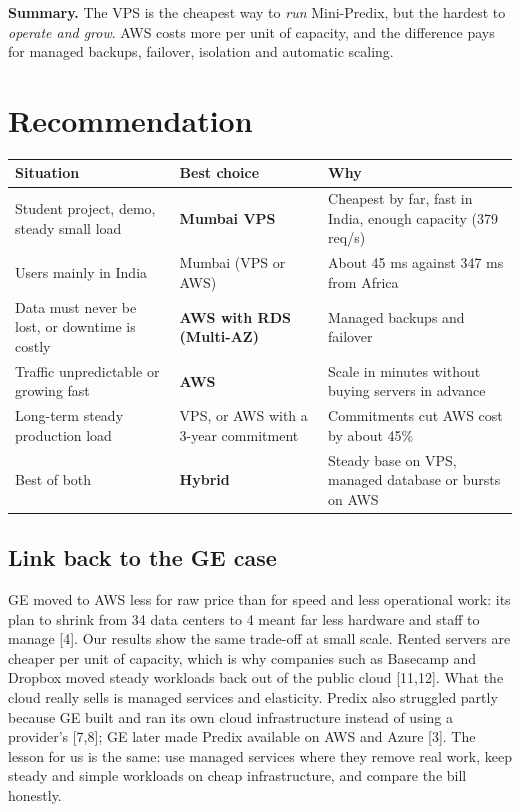 \documentclass[12pt,a4paper]{article}
\begin{document}
\textbf{Summary.} The VPS is the cheapest way to \emph{run} Mini-Predix, but the hardest to
\emph{operate and grow}. AWS costs more per unit of capacity, and the difference pays for managed
backups, failover, isolation and automatic scaling.

\section{Recommendation}
\begin{center}
\begin{tabularx}{\linewidth}{@{}p{4.6cm}p{3.6cm}L@{}}
\toprule
\textbf{Situation} & \textbf{Best choice} & \textbf{Why} \\
\midrule
Student project, demo, steady small load & \textbf{Mumbai VPS} & Cheapest by far, fast in India, enough capacity (379 req/s) \\
Users mainly in India & Mumbai (VPS or AWS) & About 45 ms against 347 ms from Africa \\
Data must never be lost, or downtime is costly & \textbf{AWS with RDS (Multi-AZ)} & Managed backups and failover \\
Traffic unpredictable or growing fast & \textbf{AWS} & Scale in minutes without buying servers in advance \\
Long-term steady production load & VPS, or AWS with a 3-year commitment & Commitments cut AWS cost by about 45\% \\
Best of both & \textbf{Hybrid} & Steady base on VPS, managed database or bursts on AWS \\
\bottomrule
\end{tabularx}
\end{center}

\subsection{Link back to the GE case}
GE moved to AWS less for raw price than for speed and less operational work: its plan to shrink from
34 data centers to 4 meant far less hardware and staff to manage [4]. Our results show the same
trade-off at small scale. Rented servers are cheaper per unit of capacity, which is why companies such
as Basecamp and Dropbox moved steady workloads back out of the public cloud [11,12]. What the cloud
really sells is managed services and elasticity. Predix also struggled partly because GE built and ran
its own cloud infrastructure instead of using a provider's [7,8]; GE later made Predix available on AWS and Azure [3].
The lesson for us is the same: use managed services where they remove real work, keep steady and
simple workloads on cheap infrastructure, and compare the bill honestly.
\end{document}
